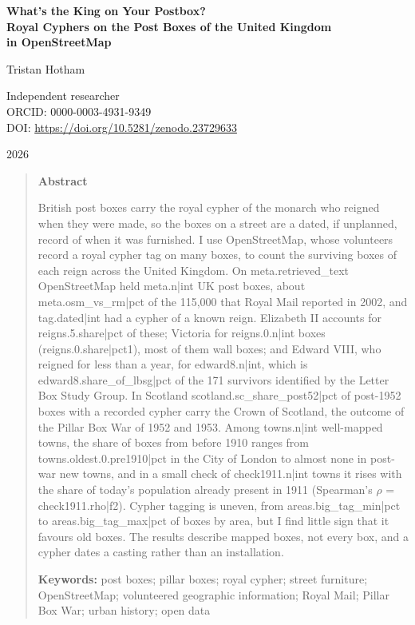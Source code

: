 \documentclass[11pt,a4paper]{article}
\begin{document}
\begin{center}
{\Large\bfseries What's the King on Your Postbox?\\[2pt] Royal Cyphers on the Post Boxes of the United Kingdom\\[2pt] in OpenStreetMap\par}
\vspace{1.2em}
{\large Tristan Hotham\par}
\vspace{0.3em}
{\small Independent researcher\\
ORCID: 0000-0003-4931-9349\\
DOI: \href{https://doi.org/10.5281/zenodo.23729633}{https://doi.org/10.5281/zenodo.23729633}\par}
\vspace{0.8em}
2026
\end{center}

\begin{quote}
\small
\begin{center}\textbf{Abstract}\end{center}
British post boxes carry the royal cypher of the monarch who reigned when they were made, so the boxes on a street are a dated, if unplanned, record of when it was furnished. I use OpenStreetMap, whose volunteers record a royal cypher tag on many boxes, to count the surviving boxes of each reign across the United Kingdom. On {{meta.retrieved_text}} OpenStreetMap held {{meta.n|int}} UK post boxes, about {{meta.osm_vs_rm|pct}} of the 115,000 that Royal Mail reported in 2002, and {{tag.dated|int}} had a cypher of a known reign. Elizabeth II accounts for {{reigns.5.share|pct}} of these; Victoria for {{reigns.0.n|int}} boxes ({{reigns.0.share|pct1}}), most of them wall boxes; and Edward VIII, who reigned for less than a year, for {{edward8.n|int}}, which is {{edward8.share_of_lbsg|pct}} of the 171 survivors identified by the Letter Box Study Group. In Scotland {{scotland.sc_share_post52|pct}} of post-1952 boxes with a recorded cypher carry the Crown of Scotland, the outcome of the Pillar Box War of 1952 and 1953. Among {{towns.n|int}} well-mapped towns, the share of boxes from before 1910 ranges from {{towns.oldest.0.pre1910|pct}} in the City of London to almost none in post-war new towns, and in a small check of {{check1911.n|int}} towns it rises with the share of today's population already present in 1911 (Spearman's $\rho$ = {{check1911.rho|f2}}). Cypher tagging is uneven, from {{areas.big_tag_min|pct}} to {{areas.big_tag_max|pct}} of boxes by area, but I find little sign that it favours old boxes. The results describe mapped boxes, not every box, and a cypher dates a casting rather than an installation.

\textbf{Keywords:} post boxes; pillar boxes; royal cypher; street furniture; OpenStreetMap; volunteered geographic information; Royal Mail; Pillar Box War; urban history; open data
\end{quote}
\end{document}
